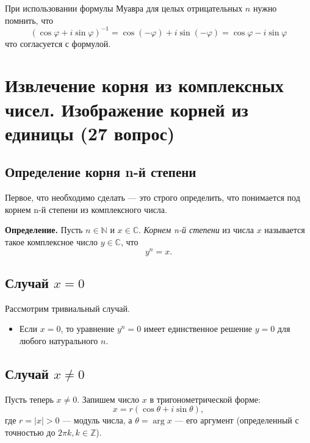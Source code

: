 \documentclass[a4paper,12pt]{article}
\theoremstyle{definition}
\theoremstyle{plain}
\theoremstyle{remark}
\begin{document}
	\begin{tcolorbox}[colback=yellow!5, colframe=orange!60!black, title=Важное замечание]
		При использовании формулы Муавра для целых отрицательных $n$ нужно помнить, что
		\[
		(\cos \varphi + i \sin \varphi)^{-1} = \cos(-\varphi) + i \sin(-\varphi) = \cos \varphi - i \sin \varphi
		\]
		что согласуется с формулой.
	\end{tcolorbox}
	
	
	
	
	
	\newpage
	\section{Извлечение корня из комплексных чисел. Изображение корней из единицы (27 вопрос)}
	
	\subsection{Определение корня n-й степени}
	
	Первое, что необходимо сделать — это строго определить, что понимается под корнем n-й степени из комплексного числа.
	
	\medskip
	
	\noindent \textbf{Определение.} Пусть \( n \in \mathbb{N} \) и \( x \in \mathbb{C} \). \textit{Корнем n-й степени} из числа \( x \) называется такое комплексное число \( y \in \mathbb{C} \), что
	\[
	y^n = x.
	\]
	
	\subsection{Случай \( x = 0 \)}
	
	Рассмотрим тривиальный случай.
	\begin{itemize}
		\item Если \( x = 0 \), то уравнение \( y^n = 0 \) имеет единственное решение \( y = 0 \) для любого натурального \( n \).
	\end{itemize}
	
	\subsection{Случай \( x \neq 0 \)}
	
	Пусть теперь \( x \neq 0 \). Запишем число \( x \) в тригонометрической форме:
	\[
	x = r(\cos \theta + i \sin \theta),
	\]
	где \( r = |x| > 0 \) — модуль числа, а \( \theta = \arg x \) — его аргумент (определенный с точностью до \( 2\pi k, k \in \mathbb{Z} \)).
	
\end{document}
